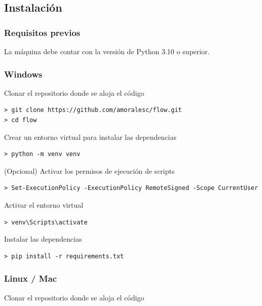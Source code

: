 \documentclass[letter,12pt]{article}
\begin{document}
\subsection{Instalación} \label{documentacion:instalacion}

\subsubsection{Requisitos previos} \label{documentacion:instalacion:requisitos}

La máquina debe contar con la versión de Python 3.10 o superior.

\subsubsection{Windows} \label{documentacion:instalacion:windows}

Clonar el repositorio donde se aloja el código

\begin{verbatim}
> git clone https://github.com/amoralesc/flow.git
> cd flow
\end{verbatim}

Crear un entorno virtual para instalar las dependencias

\begin{verbatim}
> python -m venv venv
\end{verbatim}

(Opcional) Activar los permisos de ejecución de scripts

\begin{verbatim}
> Set-ExecutionPolicy -ExecutionPolicy RemoteSigned -Scope CurrentUser
\end{verbatim}

Activar el entorno virtual

\begin{verbatim}
> venv\Scripts\activate
\end{verbatim}

Instalar las dependencias

\begin{verbatim}
> pip install -r requirements.txt
\end{verbatim}

\subsubsection{Linux / Mac} \label{documentacion:instalacion:linux}

Clonar el repositorio donde se aloja el código
\end{document}
